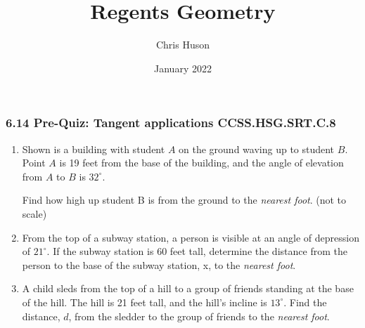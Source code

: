 \documentclass[12pt, twoside]{article}
\title{Regents Geometry}
\author{Chris Huson}
\date{January 2022}
\begin{document}
\subsubsection*{6.14 Pre-Quiz: Tangent applications \hfill CCSS.HSG.SRT.C.8}

\begin{enumerate}
\item Shown is a building with student $A$ on the ground waving up to student $B$. Point $A$ is 19 feet from the base of the building, and the angle of elevation from $A$ to $B$ is $32^\circ$.
 
Find how high up student B is from the ground to the \emph{nearest foot}. \hfill (not to scale)
  \begin{flushright}
    \end{flushright}

\item From the top of a subway station, a person is visible at an angle of depression of $21^\circ$. If the subway station is 60 feet tall, determine the distance from the person to the base of the subway station, x, to the \emph{nearest foot}.
\begin{flushright}
  \end{flushright} \vspace{1.5cm}

\item A child sleds from the top of a hill to a group of friends standing at the base of the hill. The hill is 21 feet tall, and the hill's incline is $13^\circ$. Find the distance, $d$, from the sledder to the group of friends to the \emph{nearest foot}.


\end{enumerate}
\end{document}
